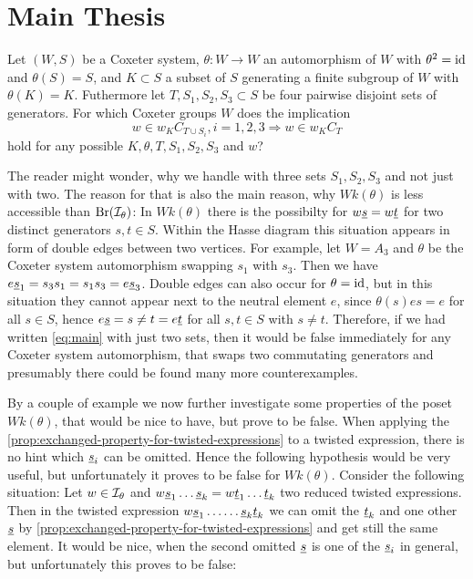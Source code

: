 \section{Main Thesis}
\label{sec:main-thesis}

\begin{ques}
	Let $(W,S)$ be a Coxeter system, $\theta : W \to W$ an automorphism of $W$ with $\theta^2 = \operatorname{id}$ and $\theta(S) = S$, and $K \subset S$ a subset of $S$ generating a finite subgroup of $W$ with $\theta(K) = K$. Futhermore let $T,S_1,S_2,S_3 \subset S$ be four pairwise disjoint sets of generators. For which Coxeter groups $W$ does the implication
	\begin{equation}
		\label{eq:main}
		w \in w_K C_{T \cup S_i}, i=1,2,3 \Rightarrow w \in w_K C_T
	\end{equation}
	hold for any possible $K,\theta,T,S_1,S_2,S_3$ and $w$?
\end{ques}

The reader might wonder, why we handle with three sets $S_1,S_2,S_3$ and not just with two. The reason for that is also the main reason, why $Wk(\theta)$ is less accessible than $\operatorname{Br}(\mathcal{I}_{\theta})$: In $Wk(\theta)$ there is the possibilty for $w \underline{s} = w \underline{t}$ for two distinct generators $s,t \in S$. Within the Hasse diagram this situation appears in form of double edges between two vertices. For example, let $W = A_3$ and $\theta$ be the Coxeter system automorphism swapping $s_1$ with $s_3$. Then we have $e \underline{s}_1 = s_3 s_1 = s_1 s_3 = e \underline{s}_3$. Double edges can also occur for $\theta = \operatorname{id}$, but in this situation they cannot appear next to the neutral element $e$, since $\theta(s)es = e$ for all $s \in S$, hence $e \underline{s} = s \neq t = e \underline{t}$ for all $s,t \in S$ with $s \neq t$. Therefore, if we had written \ref{eq:main} with just two sets, then it would be false immediately for any Coxeter system automorphism, that swaps two commutating generators and presumably there could be found many more counterexamples.

By a couple of example we now further investigate some properties of the poset $Wk(\theta)$, that would be nice to have, but prove to be false. When applying the \ref{prop:exchanged-property-for-twisted-expressions} to a twisted expression, there is no hint which $\underline{s}_i$ can be omitted. Hence the following hypothesis would be very useful, but unfortunately it proves to be false for $Wk(\theta)$. Consider the following situation: Let $w \in \mathcal{I}_{\theta}$ and $w \underline{s}_1 \ldots \underline{s}_k = w \underline{t}_1 \ldots \underline{t}_k$ two reduced twisted expressions. Then in the twisted expression $w \underline{s}_1 \ldots \ldots \underline{s}_k \underline{t}_k$ we can omit the $\underline{t}_k$ and one other $\underline{s}$ by \ref{prop:exchanged-property-for-twisted-expressions} and get still the same element. It would be nice, when the second omitted $\underline{s}$ is one of the $\underline{s}_i$ in general, but unfortunately this proves to be false:

